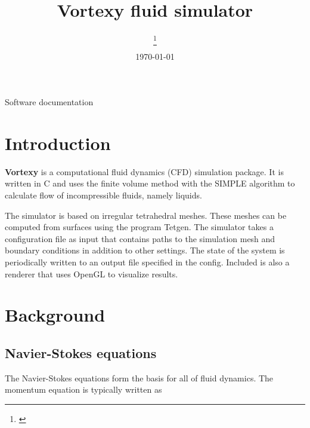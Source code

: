 \documentclass[12pt]{article}
\title {
  Vortexy fluid simulator
}
\date{\today}
\author[1] {
  \firstauth\thanks{\href{mailto: \email}{\email}}
}
\begin{document}
\setlength{\belowcaptionskip}{10pt}


\normalsize

\begin{titlingpage}
  \maketitle

  \begin{center}
    Software documentation
  \end{center}
\end{titlingpage}

\newpage

\tableofcontents

\newpage

\section{Introduction}

{\bf Vortexy} is a computational fluid dynamics (CFD) simulation package. It is written in C and uses the finite volume method with the SIMPLE algorithm to calculate flow of incompressible fluids, namely liquids.

The simulator is based on irregular tetrahedral meshes. These meshes can be computed from surfaces using the program Tetgen. The simulator takes a configuration file as input that contains paths to the simulation mesh and boundary conditions in addition to other settings. The state of the system is periodically written to an output file specified in the config. Included is also a renderer that uses OpenGL to visualize results.

\section{Background}

\subsection{Navier-Stokes equations}

\noindent

The Navier-Stokes equations form the basis for all of fluid dynamics. The momentum equation is typically written as \cite[p.~59]{tri}
\end{document}
